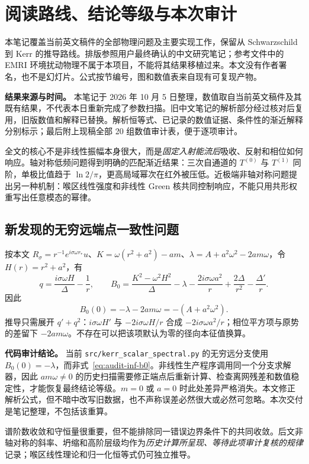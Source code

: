 \documentclass[UTF8,fontset=fandol,11pt,a4paper,oneside]{ctexart}
\numberwithin{equation}{section}
\begin{document}
\section{阅读路线、结论等级与本次审计}
本笔记覆盖当前英文稿件的全部物理问题及主要实现工作，保留从 Schwarzschild 到 Kerr 的推导路线。排版参照用户最终确认的中文研究笔记；参考文件中的 EMRI 环境扰动物理不属于本项目，不能将其结果移植过来。本文没有作者署名，也不是幻灯片。公式按节编号，图和数值表来自现有可复现产物。

\begin{note}
\textbf{结果来源与时间。} 本笔记于 2026 年 10 月 5 日整理，数值取自当前英文稿件及其既有结果，不代表本日重新完成了参数扫描。旧中文笔记的解析部分经过核对后复用，旧版数值和解释已替换。解析恒等式、已记录的数值证据、条件性的渐近解释分别标示；最后附上现稿全部 20 组数值审计表，便于逐项审计。
\end{note}

全文的核心不是非线性振幅本身很大，而是\emph{固定入射能流后}吸收、反射和相位如何响应。轴对称低频问题得到明确的匹配渐近结果：三次自通道的 $T^{(0)}$ 与 $T^{(1)}$ 同阶，单极比值趋于 $\ln2/\pi$，更高局域幂次在红外被压低。近极端非轴对称问题提出另一种机制：喉区线性强度和非线性 Green 核共同控制响应，不能只用共形权重写出任意模态的幂律。

\subsection{新发现的无穷远端点一致性问题}
按本文 $R_\sigma=r^{-1}e^{i\sigma\omega r_*}u$、$K=\omega(r^2+a^2)-am$、$\lambda=A+a^2\omega^2-2am\omega$，令 $H(r)=r^2+a^2$，有
\begin{equation}
 q=\frac{i\sigma\omega H}{\Delta}-\frac1r,
 \qquad
 B_0=\frac{K^2-\omega^2H^2}{\Delta}-\lambda
       -\frac{2i\sigma\omega a^2}{r}
       +\frac{2\Delta}{r^2}-\frac{\Delta'}r.
\label{eq:audit-exact-b0}
\end{equation}
因此
\begin{equation}
 \boxed{B_0(0)=-\lambda-2am\omega=-(A+a^2\omega^2).}
\label{eq:audit-inf-b0}
\end{equation}
推导只需展开 $q'+q^2$：$i\sigma\omega H'$ 与 $-2i\sigma\omega H/r$ 合成 $-2i\sigma\omega a^2/r$；相位平方项与原势的差留下 $-2am\omega$。不存在可以把该项默认为零的径向本征值换算。

\begin{note}
\textbf{代码审计结论。} 当前 \texttt{src/kerr\_scalar\_spectral.py} 的无穷远分支使用 $B_0(0)=-\lambda$，而非式~\eqref{eq:audit-inf-b0}。非线性生产程序调用同一个分支求解器，因此 $am\omega\ne0$ 的历史扫描需要修正端点后重新计算、检查离网残差和数值稳定性，才能恢复最终结论等级。$m=0$ 或 $a=0$ 时此处差异严格消失。本文修正解析公式，但不暗中改写旧数据，也不声称误差必然很大或必然可忽略。本次交付是笔记整理，不包括该重算。
\end{note}
谱阶数收敛和守恒量很重要，但不能排除同一错误边界条件下的共同收敛。后文非轴对称的斜率、坍缩和高阶层级均作为\emph{历史计算所呈现、等待此项审计复核的规律}记录；喉区线性理论和归一化恒等式仍可独立推导。
\end{document}
